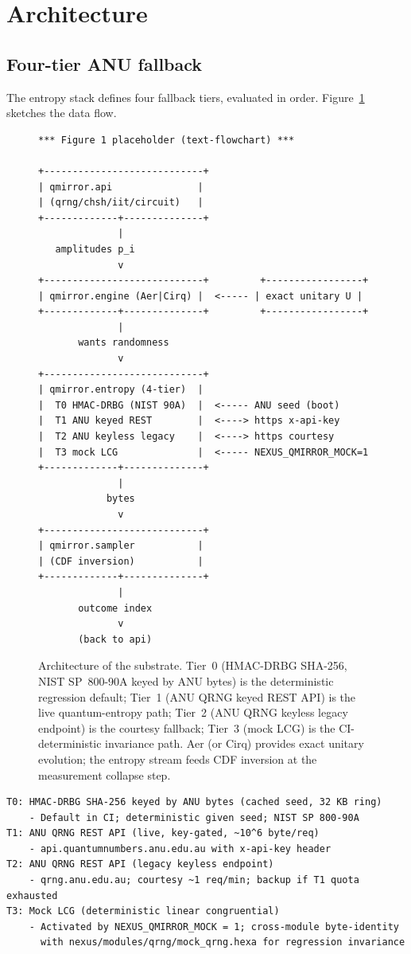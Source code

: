 \section{Architecture}\label{sec:arch}

\subsection{Four-tier ANU fallback}\label{sec:arch-anu}

The \qmirror{} entropy stack defines four fallback tiers, evaluated
in order. Figure~\ref{fig:arch} sketches the data flow.

\begin{figure}[t]
\centering
\begin{lstlisting}[basicstyle=\ttfamily\tiny,frame=single,framesep=4pt]
*** Figure 1 placeholder (text-flowchart) ***

+----------------------------+
| qmirror.api               |
| (qrng/chsh/iit/circuit)   |
+-------------+--------------+
              |
   amplitudes p_i
              v
+----------------------------+         +-----------------+
| qmirror.engine (Aer|Cirq) |  <----- | exact unitary U |
+-------------+--------------+         +-----------------+
              |
       wants randomness
              v
+----------------------------+
| qmirror.entropy (4-tier)  |
|  T0 HMAC-DRBG (NIST 90A)  |  <----- ANU seed (boot)
|  T1 ANU keyed REST        |  <----> https x-api-key
|  T2 ANU keyless legacy    |  <----> https courtesy
|  T3 mock LCG              |  <----- NEXUS_QMIRROR_MOCK=1
+-------------+--------------+
              |
            bytes
              v
+----------------------------+
| qmirror.sampler           |
| (CDF inversion)           |
+-------------+--------------+
              |
       outcome index
              v
       (back to api)
\end{lstlisting}
\caption{Architecture of the \qmirror{} substrate. Tier~0 (HMAC-DRBG
SHA-256, NIST SP~800-90A keyed by ANU bytes) is the deterministic
regression default; Tier~1 (ANU QRNG keyed REST API) is the live
quantum-entropy path; Tier~2 (ANU QRNG keyless legacy endpoint) is the
courtesy fallback; Tier~3 (mock LCG) is the CI-deterministic
invariance path. Aer (or Cirq) provides exact unitary evolution; the
entropy stream feeds CDF inversion at the measurement collapse step.}
\label{fig:arch}
\end{figure}

\begin{lstlisting}[caption={Tier definitions (extracted from
nexus/.roadmap.qmirror)},label={lst:tiers}]
T0: HMAC-DRBG SHA-256 keyed by ANU bytes (cached seed, 32 KB ring)
    - Default in CI; deterministic given seed; NIST SP 800-90A
T1: ANU QRNG REST API (live, key-gated, ~10^6 byte/req)
    - api.quantumnumbers.anu.edu.au with x-api-key header
T2: ANU QRNG REST API (legacy keyless endpoint)
    - qrng.anu.edu.au; courtesy ~1 req/min; backup if T1 quota exhausted
T3: Mock LCG (deterministic linear congruential)
    - Activated by NEXUS_QMIRROR_MOCK = 1; cross-module byte-identity
      with nexus/modules/qrng/mock_qrng.hexa for regression invariance
\end{lstlisting}

